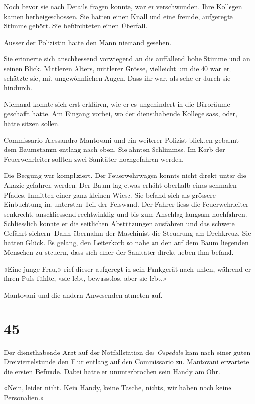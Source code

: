 Noch bevor sie nach Details fragen konnte, war er verschwunden. Ihre
Kollegen kamen herbeigeschossen. Sie hatten einen Knall und eine fremde,
aufgeregte Stimme gehört. Sie befürchteten einen Überfall.

Ausser der Polizistin hatte den Mann niemand gesehen.

Sie erinnerte sich anschliessend vorwiegend an die auffallend hohe
Stimme und an seinen Blick. Mittleren Alters, mittlerer Grösse,
vielleicht um die 40 war er, schätzte sie, mit ungewöhnlichen Augen.
Dass ihr war, als sehe er durch sie hindurch.

Niemand konnte sich erst erklären, wie er es ungehindert in die
Büroräume geschafft hatte. Am Eingang vorbei, wo der diensthabende
Kollege sass, oder, hätte sitzen sollen.

Commissario Alessandro Mantovani und ein weiterer Polizist blickten
gebannt dem Baumstamm entlang nach oben. Sie ahnten Schlimmes. Im Korb
der Feuerwehrleiter sollten zwei Sanitäter hochgefahren werden.

Die Bergung war kompliziert. Der Feuerwehrwagen konnte nicht direkt
unter die Akazie gefahren werden. Der Baum lag etwas erhöht oberhalb
eines schmalen Pfades. Inmitten einer ganz kleinen Wiese. Sie befand
sich als grössere Einbuchtung im untersten Teil der Felswand. Der Fahrer
liess die Feuerwehrleiter senkrecht, anschliessend rechtwinklig und bis
zum Anschlag langsam hochfahren. Schliesslich konnte er die seitlichen
Abstützungen ausfahren und das schwere Gefährt sichern. Dann übernahm
der Maschinist die Steuerung am Drehkreuz. Sie hatten Glück. Es gelang,
den Leiterkorb so nahe an den auf dem Baum liegenden Menschen zu
steuern, dass sich einer der Sanitäter direkt neben ihm befand.

«Eine junge Frau,» rief dieser aufgeregt in sein Funkgerät nach unten,
während er ihren Puls fühlte, «sie lebt, bewusstlos, aber sie lebt.»

Mantovani und die andern Anwesenden atmeten auf.

\chapter{45}\label{section-44}

Der diensthabende Arzt auf der Notfallstation des \emph{Ospedale} kam nach einer guten Dreiviertelstunde den Flur entlang auf den Commissario zu. Mantovani erwartete die ersten Befunde. Dabei hatte er ununterbrochen sein Handy am Ohr.

«Nein, leider nicht. Kein Handy, keine Tasche, nichts, wir haben noch keine Personalien.»

